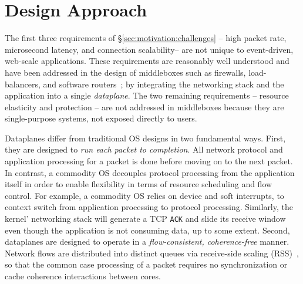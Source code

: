 \section{\ix Design Approach}
\label{sec:design}


The first three requirements of \S\ref{sec:motivation:challenges} --
high packet rate, microsecond latency, and connection scalability--
are not unique to event-driven, web-scale applications.  These
requirements are reasonably well understood and have been addressed in
the design of middleboxes such as firewalls,
load-balancers, and software
routers~\cite{DBLP:journals/tocs/KohlerMCJK00,DBLP:conf/sosp/DobrescuEACFIKMR09, missing-loadbalancers};
by integrating the networking stack and the application into a single
\emph{dataplane}. The two remaining requirements -- resource elasticity
and protection -- are not addressed in middleboxes because they
are single-purpose systems, not exposed directly to users.


Dataplanes differ from traditional OS designs in two fundamental
ways. First, they are designed to \emph{run each packet to
  completion}. All network protocol and application processing for a
packet is done before moving on to the next packet.  In contrast, a
commodity OS decouples protocol processing from the application itself
in order to enable flexibility in terms of resource scheduling and
flow control. For example, a commodity OS relies on device and soft
interrupts, to context switch from application processing to protocol
processing. Similarly, the kernel' networking stack will generate a
TCP \texttt{ACK} and slide its receive window even though the
application is not consuming data, up to some extent. Second,
dataplanes are designed to operate in a \emph{flow-consistent,
  coherence-free} manner.  Network flows are distributed into distinct
queues via receive-side scaling
(RSS)~\cite{DBLP:journals/computer/RegnierMIIMHNCF04}, so that the
common case processing of a packet requires no synchronization or
cache coherence interactions between cores.

